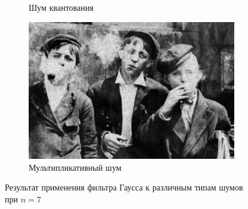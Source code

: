 \begin{figure}[ht]
\begin{subfigure}[b]{0.5\linewidth}
      \caption{Шум квантования} 
      \label{gaussian_7:e}
    \end{subfigure}%
    \begin{subfigure}[b]{0.5\linewidth}
        \centering
        \includegraphics[width=0.95\linewidth]{../Gaussian_Blur/Gaussian_Blur_Speckle_noise_(7,7).jpg} 
        \caption{Мультипликативный шум} 
        \label{gaussian_7:f} 
    \end{subfigure} 
    \caption{Результат применения фильтра Гаусса к различным типам шумов при $n = 7$}
    \label{img:gaussian_7} 
  \end{figure}

